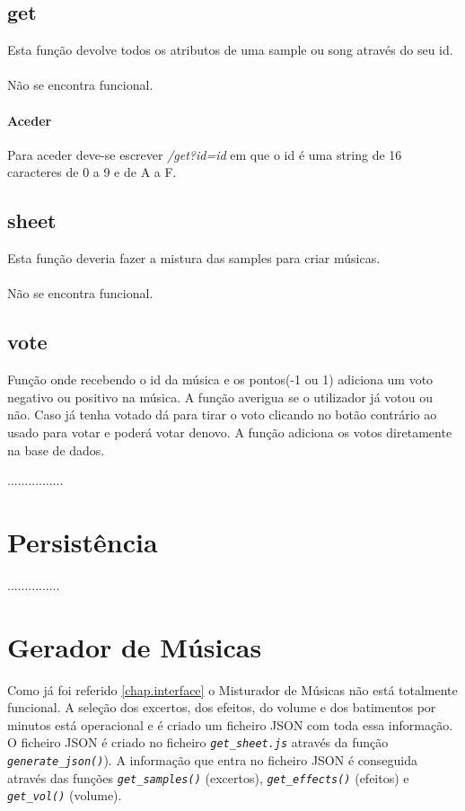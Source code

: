 \documentclass{report}
\begin{document}
 \subsection{get}
 Esta função devolve todos os atributos de uma sample ou song através do seu id.
 \paragraph{} Não se encontra funcional.
 \paragraph{Aceder} 
 Para aceder deve-se escrever \textit{/get?id=id} em que o id é uma string de 16 caracteres de 0 a 9 e de A a F.

 \subsection{sheet}
 Esta função deveria fazer a mistura das samples para criar músicas.
 \paragraph{} Não se encontra funcional.

 \subsection{vote}
Função onde recebendo o id da música e os pontos(-1 ou 1) adiciona 
um voto negativo ou positivo na música.
A função averigua se o utilizador já votou ou não. Caso já tenha votado
dá para tirar o voto clicando no botão contrário ao usado para votar e
poderá votar denovo.
A função adiciona os votos diretamente na base de dados.

................

\section{Persistência}
\label{chap.persistencia}
...............

\section{Gerador de Músicas}
\label{chap.gerador}
Como já foi referido \autoref{chap.interface} o Misturador de Músicas não está totalmente funcional. A seleção dos excertos, dos efeitos, do volume e dos batimentos por minutos está operacional e é criado um ficheiro JSON com toda essa informação. O ficheiro JSON é criado no ficheiro \textit{\texttt{get\_sheet.js}} através da função \textit{\texttt{generate\_json()}}). A informação que entra no ficheiro JSON é conseguida através das funções \textit{\texttt{get\_samples()}} (excertos), \textit{\texttt{get\_effects()}} (efeitos) e \textit{\texttt{get\_vol()}} (volume).
\end{document}
